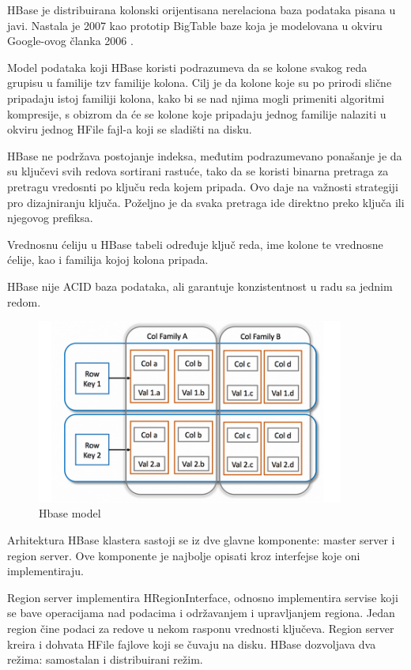 \documentclass[12pt,oneside]{memoir}
\begin{document}
HBase je distribuirana kolonski orijentisana nerelaciona baza podataka  pisana u javi.  Nastala je 2007 kao prototip BigTable baze koja je modelovana u okviru Google-ovog članka 2006 \cite{BigTable}. 

Model podataka koji HBase koristi podrazumeva da se kolone svakog reda grupisu u familije tzv familije kolona. Cilj je da kolone koje su po prirodi slične pripadaju istoj familiji kolona, kako bi se nad njima mogli primeniti algoritmi kompresije, s obizrom da će se kolone koje pripadaju jednog familije nalaziti u okviru jednog HFile fajl-a koji se sladišti na disku. 

HBase ne podržava postojanje indeksa, međutim podrazumevano ponašanje je da su ključevi svih redova sortirani rastuće, tako da se koristi binarna pretraga za pretragu vredosnti po ključu reda kojem pripada. Ovo daje na važnosti strategiji pro dizajniranju ključa. Poželjno je da svaka pretraga ide direktno preko ključa ili njegovog prefiksa. 

Vrednosnu ćeliju u HBase tabeli određuje ključ reda, ime kolone te vrednosne ćelije, kao i familija kojoj kolona pripada.

HBase nije ACID baza podataka, ali garantuje konzistentnost u radu sa jednim redom.

\begin{figure}[!ht]
  \centering
  \includegraphics[width=0.9\textwidth]{colFamily.png}
  \caption{Hbase model}
  \label{fig:grafikon}
\end{figure}

Arhitektura HBase klastera sastoji se iz dve glavne komponente:  master server i region server.  Ove komponente je najbolje opisati kroz interfejse koje oni implementiraju. 

Region server implementira HRegionInterface, odnosno implementira servise koji se bave operacijama nad podacima i održavanjem i upravljanjem regiona. Jedan region čine podaci za redove u nekom rasponu vrednosti ključeva. Region server kreira i dohvata HFile fajlove koji se čuvaju na disku. HBase dozvoljava dva režima: samostalan i distribuirani režim.
\end{document}
